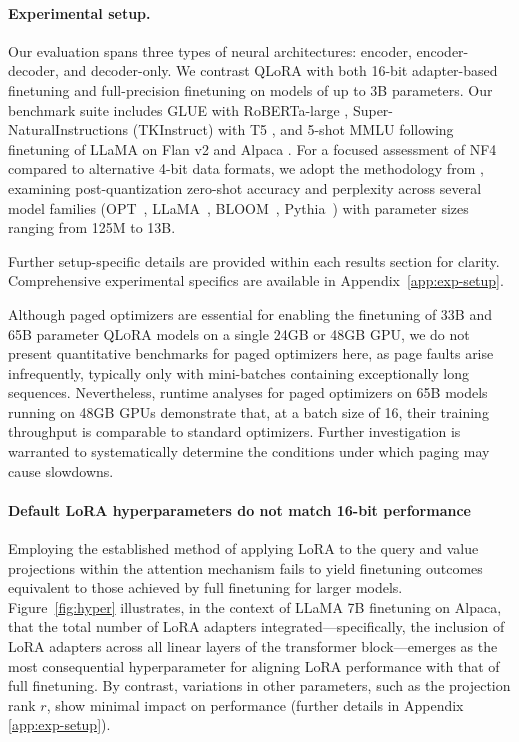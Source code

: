 \paragraph{Experimental setup.} Our evaluation spans three types of neural architectures: encoder, encoder-decoder, and decoder-only. We contrast QLoRA with both 16-bit adapter-based finetuning and full-precision finetuning on models of up to 3B parameters. Our benchmark suite includes GLUE \citep{wang2018glue} with RoBERTa-large \citep{liu2019roberta}, Super-NaturalInstructions (TKInstruct) \citep{wang2022super} with T5 \citep{t5}, and 5-shot MMLU \citep{hendrycksmeasuring} following finetuning of LLaMA on Flan v2 \citep{longpre2023flan} and Alpaca \citep{alpaca}. For a focused assessment of NF4 compared to alternative 4-bit data formats, we adopt the methodology from \citet{dettmers2022case}, examining post-quantization zero-shot accuracy and perplexity across several model families (OPT~\citep{zhang2022opt}, LLaMA~\citep{touvron2023llama}, BLOOM~\citep{scao2022bloom}, Pythia~\citep{biderman2023pythia}) with parameter sizes ranging from 125M to 13B.

Further setup-specific details are provided within each results section for clarity. Comprehensive experimental specifics are available in Appendix~\ref{app:exp-setup}.

Although paged optimizers are essential for enabling the finetuning of 33B and 65B parameter \textsc{QLoRA} models on a single 24GB or 48GB GPU, we do not present quantitative benchmarks for paged optimizers here, as page faults arise infrequently, typically only with mini-batches containing exceptionally long sequences. Nevertheless, runtime analyses for paged optimizers on 65B models running on 48GB GPUs demonstrate that, at a batch size of 16, their training throughput is comparable to standard optimizers. Further investigation is warranted to systematically determine the conditions under which paging may cause slowdowns.

\paragraph{Default LoRA hyperparameters do not match 16-bit performance}

Employing the established method of applying LoRA to the query and value projections within the attention mechanism \citep{hu2021lora} fails to yield finetuning outcomes equivalent to those achieved by full finetuning for larger models. Figure~\ref{fig:hyper} illustrates, in the context of LLaMA 7B finetuning on Alpaca, that the total number of LoRA adapters integrated—specifically, the inclusion of LoRA adapters across all linear layers of the transformer block—emerges as the most consequential hyperparameter for aligning LoRA performance with that of full finetuning. By contrast, variations in other parameters, such as the projection rank $r$, show minimal impact on performance (further details in Appendix \ref{app:exp-setup}).

